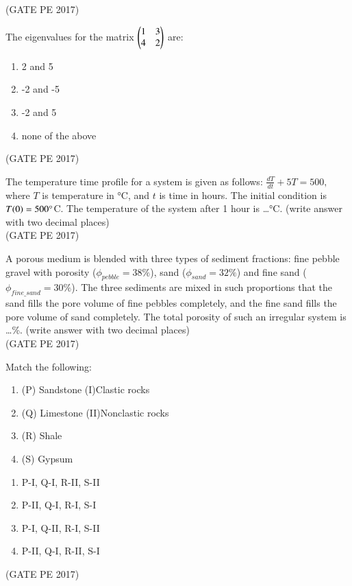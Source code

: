 \documentclass[journal,12pt,onecolumn]{IEEEtran}
\theoremstyle{remark}
\begin{document}
\begin{enumerate}
{\hfill{(GATE PE 2017)}

\item The eigenvalues for the matrix $ \begin{pmatrix}
1 & 3 \\
4 & 2 
\end{pmatrix}$ are:
\begin{enumerate}
\item 2 and 5
\item -2 and -5
\item -2 and 5
\item none of the above
\end{enumerate}
\hfill{(GATE PE 2017)}

\item The temperature time profile for a system is given as follows:
$ \frac{dT}{dt} + 5T = 500,$ where $T$ is temperature in °C, and $t$ is time in hours. The initial condition is $T(0) = 500\degree$C.
The temperature of the system after 1 hour is \dots °C. (write answer with two decimal places)\\

\hfill{(GATE PE 2017)}

\item A porous medium is blended with three types of sediment fractions: fine pebble gravel with porosity ($\phi_{pebble} = 38\%$), sand ($\phi_{sand} = 32\%$) and fine sand ($\phi_{fine\_sand} = 30\%$). The three sediments are mixed in such proportions that the sand fills the pore volume of fine pebbles completely, and the fine sand fills the pore volume of sand completely.
The total porosity of such an irregular system is \dots \%. (write answer with two decimal places)\\

\hfill{(GATE PE 2017)}

\item Match the following:\\
\begin{enumerate}
    \item (P) Sandstone  (I)Clastic rocks\\
    \item (Q) Limestone (II)Nonclastic rocks\\
    \item (R) Shale
    \item (S) Gypsum
\end{enumerate}
\begin{enumerate}
    \item P-I, Q-I, R-II, S-II
    \item P-II, Q-I, R-I, S-I
    \item P-I, Q-II, R-I, S-II
    \item P-II, Q-I, R-II, S-I
\end{enumerate}
\hfill{(GATE PE 2017)}

}
\end{enumerate}
\end{document}
